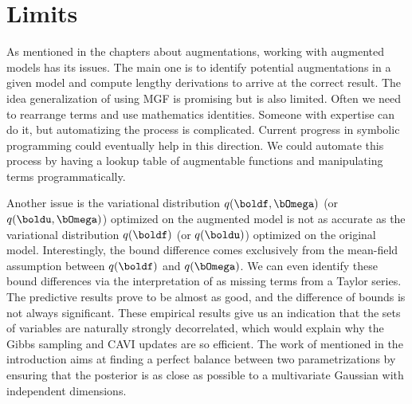 \section{Limits}

As mentioned in the chapters about augmentations, working with augmented models has its issues.
The main one is to identify potential augmentations in a given model and compute lengthy derivations to arrive at the correct result.
The idea generalization of using \ac{MGF} is promising but is also limited.
Often we need to rearrange terms and use mathematics identities.
Someone with expertise can do it, but automatizing the process is complicated.
Current progress in symbolic programming could eventually help in this direction.
We could automate this process by having a lookup table of augmentable functions and manipulating terms programmatically.

Another issue is the variational distribution $q(\boldf, \bOmega)$ (or $q(\boldu, \bOmega)$) optimized on the augmented model is not as accurate as the variational distribution $q(\boldf)$ (or $q(\boldu)$) optimized on the original model.
Interestingly, the bound difference comes exclusively from the mean-field assumption between $q(\boldf)$ and $q(\bOmega)$.
We can even identify these bound differences via the interpretation of \citet{jaakkolaVariationalApproachBayesian1997} as missing terms from a Taylor series.
The predictive results prove to be almost as good, and the difference of bounds is not always significant.
These empirical results give us an indication that the sets of variables are naturally strongly decorrelated, which would explain why the Gibbs sampling and \ac{CAVI} updates are so efficient.
The work of \citet{gorinovaAutomaticReparameterisationProbabilistic2020} mentioned in the introduction aims at finding a perfect balance between two parametrizations by ensuring that the posterior is as close as possible to a multivariate Gaussian with independent dimensions.




